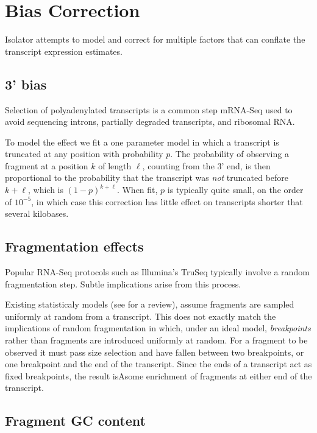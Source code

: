 \documentclass{article}
\begin{document}
\section{Bias Correction}\label{bias-correction}

Isolator attempts to model and correct for multiple factors that can
conflate the transcript expression estimates.

\subsection{3' bias}\label{bias}

Selection of polyadenylated transcripts is a common step mRNA-Seq used
to avoid sequencing introns, partially degraded transcripts, and
ribosomal RNA.

To model the effect we fit a one parameter model in which a transcript
is truncated at any position with probability $p$. The probability of
observing a fragment at a position $k$ of length $\ell$, counting from
the 3' end, is then proportional to the probability that the transcript
was \emph{not} truncated before $k + \ell$, which is $(1-p)^{k + \ell}$.
When fit, $p$ is typically quite small, on the order of $10^{-5}$, in
which case this correction has little effect on transcripts shorter that
several kilobases.

\subsection{Fragmentation effects}\label{fragmentation-effects}

Popular RNA-Seq protocols such as Illumina's TruSeq typically involve a
random fragmentation step. Subtle implications arise from this process.

Existing statisticaly models (see \cite{Pachter:2011wm} for a review),
assume fragments are sampled uniformly at random from a transcript. This
does not exactly match the implications of random fragmentation in
which, under an ideal model, \emph{breakpoints} rather than fragments
are introduced uniformly at random. For a fragment to be observed it
must pass size selection and have fallen between two breakpoints, or one
breakpoint and the end of the transcript. Since the ends of a transcript
act as fixed breakpoints, the result isAsome enrichment of fragments at
either end of the transcript.

\subsection{Fragment GC content}\label{fragment-gc-content}
\end{document}
